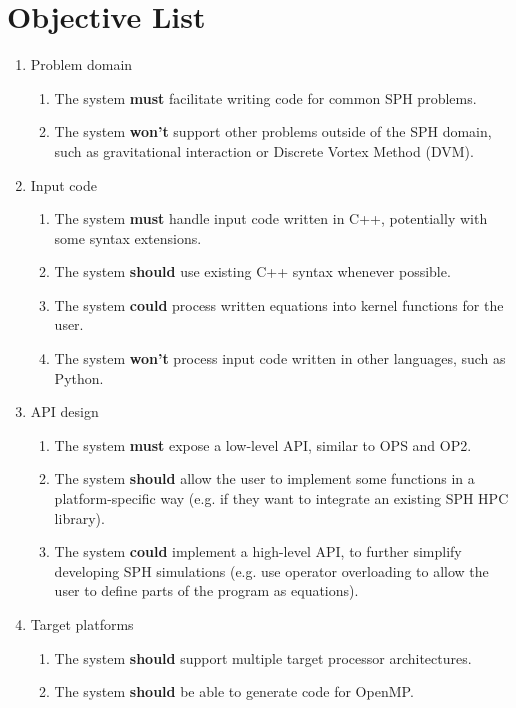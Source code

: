 \section{Objective List}
\begin{enumerate}
    \item Problem domain
    \begin{enumerate}
        \item The system \textbf{must} facilitate writing code for common SPH problems.
        \item The system \textbf{won't} support other problems outside of the SPH domain, such as gravitational interaction or Discrete Vortex Method (DVM).
    \end{enumerate}
    \item Input code
    \begin{enumerate}
        \item The system \textbf{must} handle input code written in C++, potentially with some syntax extensions.
        \item The system \textbf{should} use existing C++ syntax whenever possible.
        \item The system \textbf{could} process written equations into kernel functions for the user.
        \item The system \textbf{won't} process input code written in other languages, such as Python.
    \end{enumerate}
    \item API design
    \begin{enumerate}
        \item The system \textbf{must} expose a low-level API, similar to OPS and OP2.
        \item The system \textbf{should} allow the user to implement some functions in a platform-specific way (e.g. if they want to integrate an existing SPH HPC library).
        \item The system \textbf{could} implement a high-level API, to further simplify developing SPH simulations (e.g. use operator overloading to allow the user to define parts of the program as equations).
    \end{enumerate}
    \item Target platforms
    \begin{enumerate}
        \item The system \textbf{should} support multiple target processor architectures.
        \item The system \textbf{should} be able to generate code for OpenMP.

\end{enumerate}
\end{enumerate}
